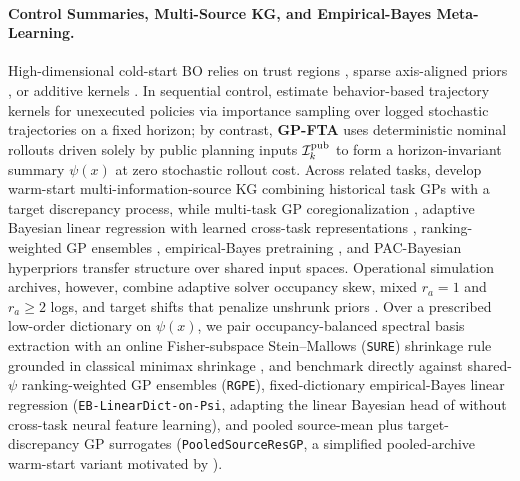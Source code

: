 \paragraph{Control Summaries, Multi-Source KG, and Empirical-Bayes Meta-Learning.}
High-dimensional cold-start BO relies on trust regions \citep{eriksson2019scalable,eriksson2021scalable}, sparse axis-aligned priors \citep{eriksson2021high}, or additive kernels \citep{kandasamy2015high,lu2022additive}. In sequential control, \citet{wilson2014using} estimate behavior-based trajectory kernels for unexecuted policies via importance sampling over logged stochastic trajectories on a fixed horizon; by contrast, \textbf{GP-FTA} uses deterministic nominal rollouts driven solely by public planning inputs $\mathcal{I}_k^{\mathrm{pub}}$ to form a horizon-invariant summary $\psi(x)$ at zero stochastic rollout cost. Across related tasks, \citet{poloczek2017multi} develop warm-start multi-information-source KG combining historical task GPs with a target discrepancy process, while multi-task GP coregionalization \citep{swersky2013multi}, adaptive Bayesian linear regression with learned cross-task representations \citep[\texttt{ABLR};][]{perrone2018scalable}, ranking-weighted GP ensembles \citep[\texttt{RGPE};][]{feurer2018scalable}, empirical-Bayes pretraining \citep[\texttt{HyperBO};][]{wang2024pretrained}, and PAC-Bayesian hyperpriors \citep{rothfuss2021pacoh} transfer structure over shared input spaces. Operational simulation archives, however, combine adaptive solver occupancy skew, mixed $r_a = 1$ and $r_a \ge 2$ logs, and target shifts that penalize unshrunk priors \citep{bissiri2016general,grunwald2017inconsistency,rasmussen2006gaussian}. Over a prescribed low-order dictionary on $\psi(x)$, we pair occupancy-balanced spectral basis extraction with an online Fisher-subspace Stein--Mallows (\texttt{SURE}) shrinkage rule grounded in classical minimax shrinkage \citep{james1961estimation,baranchik1970family,mallows1973some,efron1973stein,stein1981estimation}, and benchmark directly against shared-$\psi$ ranking-weighted GP ensembles (\texttt{RGPE}), fixed-dictionary empirical-Bayes linear regression (\texttt{EB-LinearDict-on-Psi}, adapting the linear Bayesian head of \citealp{perrone2018scalable} without cross-task neural feature learning), and pooled source-mean plus target-discrepancy GP surrogates (\texttt{PooledSourceResGP}, a simplified pooled-archive warm-start variant motivated by \citealp{poloczek2017multi}).
